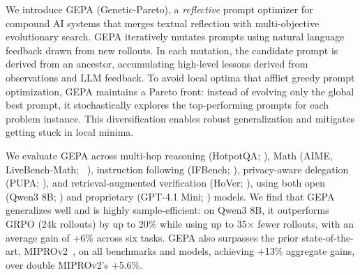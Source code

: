\documentclass{article} %
\begin{document}



We introduce GEPA (Genetic-Pareto), a \textit{reflective} prompt optimizer for compound AI systems that merges textual reflection with multi-objective evolutionary search. GEPA iteratively mutates prompts using natural language feedback drawn from new rollouts. In each mutation, the candidate prompt is derived from an ancestor, accumulating high-level lessons derived from observations and LLM feedback. 
To avoid local optima that afflict greedy prompt optimization, GEPA maintains a Pareto front: instead of evolving only the global best prompt, it stochastically explores the top-performing prompts for each problem instance. This diversification enables robust generalization and mitigates getting stuck in local minima.

We evaluate GEPA across multi-hop reasoning (HotpotQA; \citealt{hotpotqa_bench}), Math (AIME, LiveBench-Math; ~\cite{aime_2025, livebench}), instruction following (IFBench; \citealt{ifbench_bench}), privacy-aware delegation (PUPA; \citealt{papillon_bench}), and retrieval-augmented verification (HoVer; \citealt{hover_bench}), using both open (Qwen3 8B; \citealt{qwen3_technical_report, qwen3_8b_hf}) and proprietary (GPT-4.1 Mini; \citealt{gpt_41_model}) models.
We find that GEPA generalizes well and is highly sample-efficient: on Qwen3 8B, it outperforms GRPO (24k rollouts) by up to 20\% while using up to 35$\times$ fewer rollouts, with an average gain of +6\% across six tasks.
GEPA also surpasses the prior state-of-the-art, MIPROv2~\citep{miprov2}, on all benchmarks and models, achieving +13\% aggregate gains, over double MIPROv2’s +5.6\%.
\end{document}
